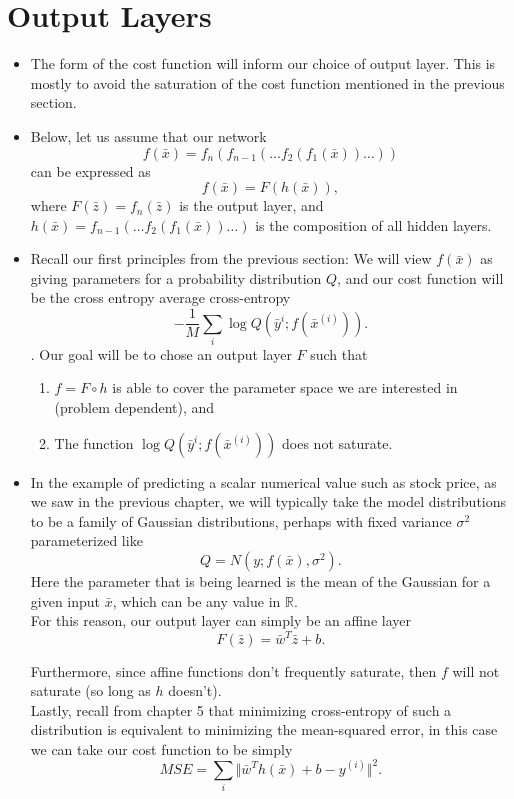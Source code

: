 \documentclass{article}
\begin{document}
\section{Output Layers}
\begin{itemize}

\item The form of the cost function will inform our choice of output layer.  This is mostly to avoid the saturation of the cost function mentioned in the previous section.

\item Below, let us assume that our network 
$$f(\bar{x}) =  f_{n}(f_{n-1}(\ldots f_{2}(f_{1}(\bar{x}))\ldots ))$$
 can be expressed as 
 $$f(\bar{x}) = F(h(\bar{x})),$$ where $F(\bar{z}) = f_{n}(\bar{z})$ is the output layer, and $h(\bar{x}) = f_{n-1}(\ldots f_{2}(f_{1}(\bar{x}))\ldots )$ is the composition of all hidden layers.

\item Recall our first principles from the previous section:  We will view $f(\bar{x})$ as giving parameters for a probability distribution $Q$, and our cost function will be the
cross entropy average cross-entropy $$-\frac{1}{M}\sum_{i} \log{Q(\bar{y}^{i} ; f(\bar{x}^{(i)}))}.$$. Our goal will be to chose an output layer $F$ such that 

\begin{enumerate}
\item $f = F\circ h$ is able to cover the parameter space we are interested in (problem dependent), and 
\item The function $\log{Q(\bar{y}^{i} ; f(\bar{x}^{(i)}))}$ does not saturate.
\end{enumerate}

\item In the example of predicting a scalar numerical value such as stock price, as we saw in the previous chapter, we will typically take the model distributions to be a family of Gaussian distributions, perhaps with fixed variance $\sigma^{2}$ parameterized like
 $$Q = N(y; f(\bar{x}), \sigma^{2}).$$  
 Here the parameter that is being learned is the mean of the Gaussian for a given input $\bar{x}$, which can be any value in $\mathbb{R}$.  \\
 For this reason, our output layer can simply be an affine layer $$F(\bar{z}) = \bar{w}^{T}\bar{z} + b.$$ 

 Furthermore, since affine functions don't frequently saturate, then $f$ will not saturate (so long as $h$ doesn't).  
\\ Lastly, recall from chapter 5 that minimizing cross-entropy of such a distribution is equivalent to minimizing the mean-squared error, in this case we can take our cost function to be simply 
 $$MSE  = \sum_{i} \Vert \bar{w}^{T}h(\bar{x}) + b - y^{(i)}\Vert^{2}.$$


\end{itemize}
\end{document}

